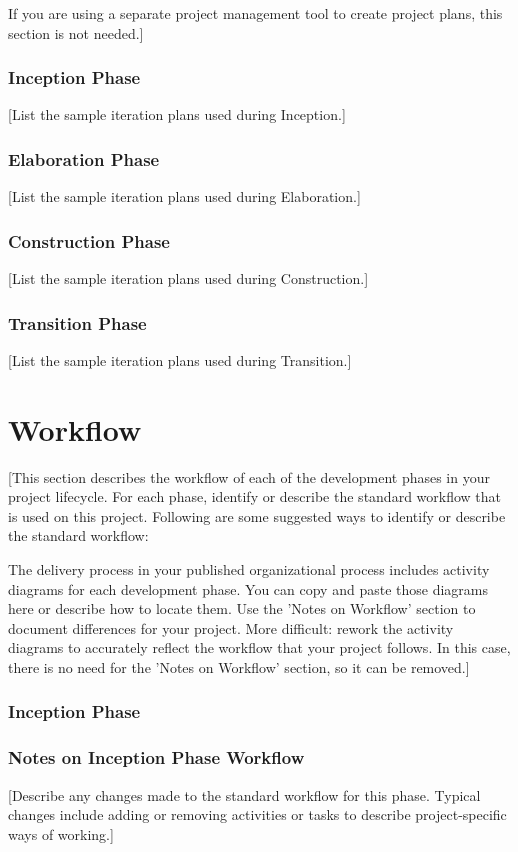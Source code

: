 If you are using a separate project management tool to create project plans, this section is not needed.]

\subsubsection*{Inception Phase}
[List the sample iteration plans used during Inception.]

\subsubsection*{Elaboration Phase}
[List the sample iteration plans used during Elaboration.]

\subsubsection*{Construction Phase}
[List the sample iteration plans used during Construction.]

\subsubsection*{Transition Phase}
[List the sample iteration plans used during Transition.]

\section*{Workflow}
[This section describes the workflow of each of the development phases in your project lifecycle. For each phase, identify or describe the standard workflow that is used on this project. Following are some suggested ways to identify or describe the standard workflow:

The delivery process in your published organizational process includes activity diagrams for each development phase. You can copy and paste those diagrams here or describe how to locate them. Use the 'Notes on Workflow' section to document differences for your project.
More difficult: rework the activity diagrams to accurately reflect the workflow that your project follows. In this case, there is no need for the 'Notes on Workflow' section, so it can be removed.]

\subsubsection*{Inception Phase}

\subsubsection*{Notes on Inception Phase Workflow}
[Describe any changes made to the standard workflow for this phase. Typical changes include adding or removing activities or tasks to describe project-specific ways of working.]

